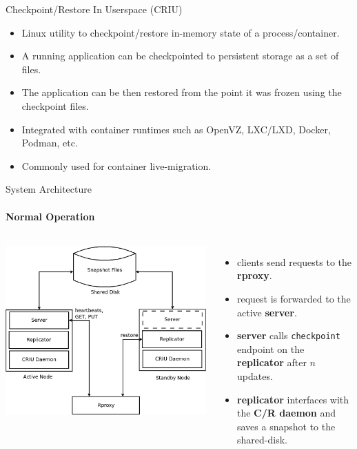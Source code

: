 \documentclass{beamer}
\begin{document}
\begin{frame}{Checkpoint/Restore In Userspace (CRIU)}
  \begin{itemize}
    \item Linux utility to checkpoint/restore in-memory state of a process/container. \pause
    \item A running application can be checkpointed to persistent storage as a set of files. \pause
    \item The application can be then restored from the point it was frozen
    using the checkpoint files. \pause
    \item Integrated with container runtimes such as OpenVZ, LXC/LXD, Docker, Podman, etc.
    \item Commonly used for container live-migration.
  \end{itemize}
\end{frame}

\begin{frame}{System Architecture}
  \framesubtitle{Normal Operation}

  \begin{columns}
    \includegraphics[scale=0.15]{../paper/arch}

    \begin{itemize}
      \pause \item clients send requests to the \textbf{rproxy}.
      \pause \item request is forwarded to the active \textbf{server}.
      \pause \item \textbf{server} calls \texttt{checkpoint} endpoint on the \textbf{replicator} after $n$ updates.
      \pause \item \textbf{replicator} interfaces with the \textbf{C/R daemon} and saves a snapshot to the shared-disk.
    \end{itemize}
  \end{columns}
\end{frame}
\end{document}
